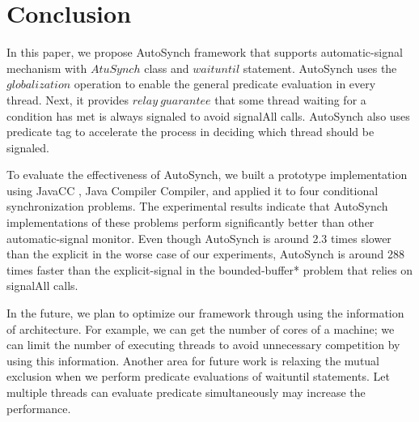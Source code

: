 \documentclass[preprint]{sigplanconf}
\begin{document}

\section{Conclusion} \label{sec:conclu}
In this paper, we propose AutoSynch framework that supports 
automatic-signal mechanism with $AtuSynch$ class and $waituntil$ statement.
AutoSynch uses the $globalization$ operation to enable the general predicate 
evaluation in every thread. Next, it provides $relay\ guarantee$ that some
thread waiting for a condition has met is always signaled to avoid signalAll
calls. AutoSynch also uses predicate tag to accelerate the process in deciding
which thread should be signaled. 

To evaluate the effectiveness of AutoSynch, we built a prototype implementation
using JavaCC \cite{kod04}, Java Compiler Compiler,  and applied it to four
conditional synchronization problems. The experimental results indicate that 
AutoSynch implementations of these problems perform significantly better than
other automatic-signal monitor. Even though AutoSynch is around 2.3 times 
slower than the explicit in the worse case of our experiments, AutoSynch is
around 288 times faster than the explicit-signal in the bounded-buffer* problem 
that relies on signalAll calls. 

In the future, we plan to optimize our framework through using the information 
of architecture. For example, we can get the number of cores of a machine; we
can limit the number of executing threads to avoid unnecessary competition by
using this information. Another area for future work is relaxing the mutual
exclusion when we perform predicate evaluations of waituntil statements. Let
multiple threads can evaluate predicate simultaneously may increase the
performance. 

\end{document}
